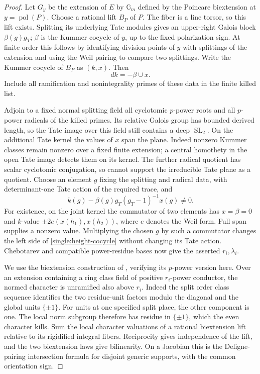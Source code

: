 \begin{proof}
Let \(G_y\) be the extension of \(E\) by \(\mathbb G_m\) defined
by the Poincare biextension at \(y=\operatorname{pol}(P)\).
Choose a rational lift \(B_P\) of \(P\).  The fiber is a line
torsor, so this lift exists.  Splitting its underlying Tate
modules gives an upper-right Galois block \(\beta(g)g_T\);
\(\beta\) is the Kummer cocycle of \(y\), up to the fixed
polarization sign.  At finite order this follows by identifying
division points of \(y\) with splittings of the extension and
using the Weil pairing to compare two splittings.  Write the
Kummer cocycle of \(B_P\) as \((k,x)\).  Then
\[
                         dk=-\beta\cup x.
\]
Include all ramification and nonintegrality primes of these
data in the finite killed list.

Adjoin to a fixed normal splitting field all cyclotomic
\(p\)-power roots and all \(p\)-power radicals of the killed
primes.  Its relative Galois group has bounded derived length,
so the Tate image over this field still contains a deep
\(\operatorname{SL}_2\).  On the additional Tate kernel the
values of \(x\) span the plane.  Indeed nonzero Kummer classes
remain nonzero over a fixed finite extension; a central
homothety in the open Tate image detects them on its kernel.
The further radical quotient has scalar cyclotomic conjugation,
so cannot support the irreducible Tate plane as a quotient.
Choose an element \(g\) fixing the splitting and radical data,
with determinant-one Tate action of the required trace, and
\begin{equation}\label{single:height-cocycle}
       k(g)-\beta(g)g_T(g_T-1)^{-1}x(g)\ne0.
\end{equation}
For existence, on the joint kernel the commutator of two
elements has \(x=\beta=0\) and \(k\)-value
\(\pm2e(x(h_1),x(h_2))\), where \(e\) denotes the Weil form.
Full span supplies a nonzero value.
Multiplying the chosen \(g\) by such a commutator changes the
left side of \eqref{single:height-cocycle} without changing its
Tate action.  Chebotarev and compatible power-residue bases now
give the asserted \(r_i,\lambda_i\).

We use the biextension construction of \cite[Section~6,
``Tame heights and trace compatibility'']{B}, verifying its
\(p\)-power version here.  Over an extension
containing a ring class field of positive \(r_i\)-power
conductor, the normed character is unramified also above
\(r_i\).  Indeed the split order class sequence identifies the
two residue-unit factors modulo the diagonal and the global
units \(\{\pm1\}\).  For units at one specified split place,
the other component is one.  The local norm subgroup therefore
has residue in \(\{\pm1\}\), which the even character kills.
Sum the local character valuations of a rational
biextension lift relative to its rigidified integral fibers.
Reciprocity gives independence of the lift, and the two
biextension laws give bilinearity.  On a Jacobian this is the
Deligne-pairing intersection formula for disjoint generic
supports, with the common orientation sign.


\end{proof}
